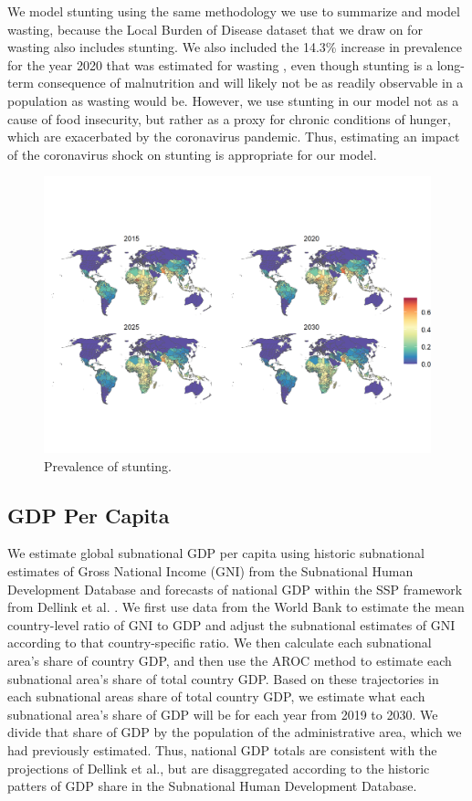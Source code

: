 \documentclass{article}
\begin{document}
We model stunting using the same methodology we use to summarize and model wasting, because the Local Burden of Disease dataset that we draw on for wasting also includes stunting.  We also included the 14.3\% increase in prevalence for the year 2020 that was estimated for wasting \citep{headey2020impacts}, even though stunting is a long-term consequence of malnutrition and will likely not be as readily observable in a population as wasting would be.  However, we use stunting in our model not as a cause of food insecurity, but rather as a proxy for chronic conditions of hunger, which are exacerbated by the coronavirus pandemic.  Thus, estimating an impact of the coronavirus shock on stunting is appropriate for our model.

\begin{figure}[H]
  \centering
  \includegraphics[width=\linewidth]{img/covars/stunting.png}
  \caption{Prevalence of stunting.}
\end{figure}

\subsection{GDP Per Capita}
We estimate global subnational GDP per capita using historic subnational estimates of Gross National Income (GNI) from the Subnational Human Development Database \cite{Smits2019} and forecasts of national GDP within the SSP framework from Dellink et al. \cite{Dellink2017}.  We first use data from the World Bank to estimate the mean country-level ratio of GNI to GDP and adjust the subnational estimates of GNI according to that country-specific ratio.  We then calculate each subnational area's share of country GDP, and then use the AROC method to estimate each subnational area's share of total country GDP.  Based on these trajectories in each subnational areas share of total country GDP, we estimate what each subnational area's share of GDP will be for each year from 2019 to 2030.  We divide that share of GDP by the population of the administrative area, which we had previously estimated.  Thus, national GDP totals are consistent with the projections of Dellink et al., but are disaggregated according to the historic patters of GDP share in the Subnational Human Development Database.
\end{document}
